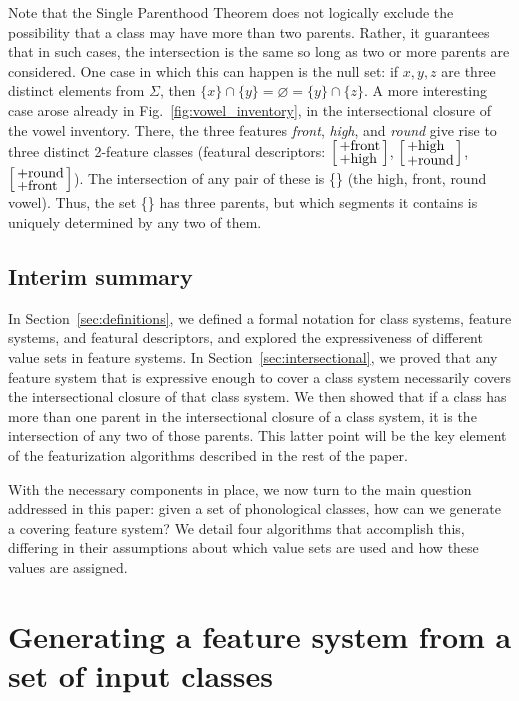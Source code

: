 \documentclass[12pt, oneside]{article}   	%
\newcommand{\featmattwo}[2]{$\begin{bsmallmatrix*}[l]\text{\normalsize #1}\\\text{\normalsize #2}\end{bsmallmatrix*}$}
\begin{document}
\vspace{\baselineskip} Note that the Single Parenthood Theorem does not logically exclude the possibility that a class may have more than two parents. Rather, it guarantees that in such cases, the intersection is the same so long as two or more parents are considered. One case in which this can happen is the null set: if $x, y, z$ are three distinct elements from $\Sigma$, then $\{ x \} \cap \{ y \} = \varnothing = \{ y \} \cap \{ z \}$. A more interesting case arose already in Fig.~\ref{fig:vowel_inventory}, in the intersectional closure of the vowel inventory. There, the three features \textit{front}, \textit{high}, and \textit{round} give rise to three distinct 2-feature classes (featural descriptors: \featmattwo{+front}{+high}, \featmattwo{+high}{+round}, \featmattwo{+round}{+front}). The intersection of any pair of these is \{\} (the high, front, round vowel). Thus, the set  \{\} has three parents, but which segments it contains is uniquely determined by any two of them.

\subsection{Interim summary}

In Section~\ref{sec:definitions}, we defined a formal notation for class systems, feature systems, and featural descriptors, and explored the expressiveness of different value sets in feature systems. In Section~\ref{sec:intersectional}, we proved that any feature system that is expressive enough to cover a class system necessarily covers the intersectional closure of that class system. We then showed that if a class has more than one parent in the intersectional closure of a class system, it is the intersection of any two of those parents. This latter point will be the key element of the featurization algorithms described in the rest of the paper.

With the necessary components in place, we now turn to the main question addressed in this paper: given a set of phonological classes, how can we generate a covering feature system? We detail four algorithms that accomplish this, differing in their assumptions about which value sets are used and how these values are assigned.

\FloatBarrier
\section{Generating a feature system from a set of input classes}
\label{sec:algorithm_intro}
\end{document}
